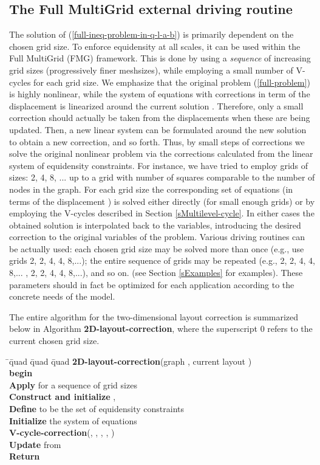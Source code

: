 \documentclass[final]{siamltex}
\newcommand{\keyw}[1]{{\bf #1}}
\begin{document}
\subsection{The Full MultiGrid external driving routine}\label{sExternalCycle}
\par The solution of (\ref{full-ineq-problem-in-q-l-a-b}) is primarily dependent on the chosen grid size.
To enforce equidensity at all scales, it can be used within the
Full MultiGrid (FMG) framework. This is done by using a {\it
sequence} of increasing grid sizes (progressively finer
meshsizes), while employing a small number of V-cycles for each
grid size. We emphasize that the original problem
(\ref{full-problem}) is highly nonlinear, while the system of
equations with corrections in term of the displacement  is
linearized around the current solution .
Therefore, only a small correction should actually be taken from
the  displacements when these  are
being updated. Then, a new linear system can be formulated around
the new solution to obtain a new correction, and so forth. Thus, by small
steps of corrections we solve the original nonlinear problem via
the corrections calculated from the linear system of equidensity
constraints. For instance, we have tried to employ grids of sizes:
2, 4, 8, ... up to a grid with number of squares comparable to the
number of nodes in the graph. For each grid size the corresponding
set of equations (in terms of the displacement ) is solved
either directly (for small enough grids) or by employing the
V-cycles described in Section \ref{sMultilevel-cycle}. In either
cases the obtained solution  is interpolated back to the
 variables, introducing the desired correction to the
original variables of the problem. Various driving routines can be
actually used: each chosen grid size may be solved more than once
(e.g., use grids 2, 2, 4, 4, 8,...); the entire sequence of grids
may be repeated (e.g., 2, 2, 4, 4, 8,... , 2, 2, 4, 4, 8,...),
and so on. (see Section \ref{sExamples} for examples). These parameters
should in fact be optimized for each application according to the
concrete needs of the model.
\par The entire algorithm for the two-dimensional layout correction
is summarized below in Algorithm {\bf 2D-layout-correction}, where
the superscript 0 refers to the current chosen grid size.
\vspace{3mm}
\begin{tabbing}
  \quad \=\quad \=quad \=quad \=quad         \kill
  {\bf 2D-layout-correction}(graph , current layout )\\
  \keyw{begin}\\
  \> \keyw{Apply} for a sequence of grid sizes\\
  \>\> \keyw{Construct and initialize } , \\
  \>\> \keyw{Define}  to be the set of equidensity constraints\\
  \>\> \keyw{Initialize} the system of equations \\
  \>\> \keyw{V-cycle-correction}(, , , , )\\
  \>\> \keyw{Update }  from \\
   \keyw{Return} \\
\end{tabbing}
\end{document}

